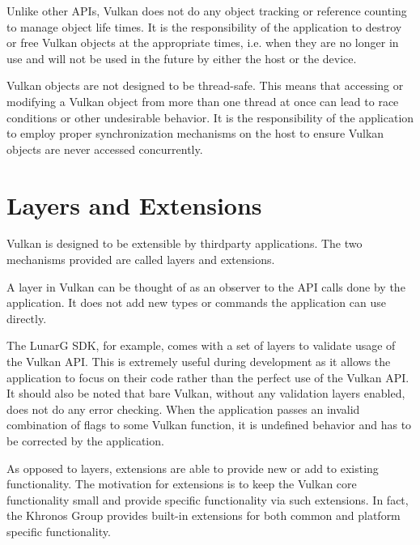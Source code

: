     Unlike other APIs, Vulkan does not do any object tracking or reference counting to manage object life times.
    It is the responsibility of the \gls{application} to destroy or free Vulkan objects at the appropriate times, i.e.
    when they are no longer in use and will not be used in the future by either the \gls{host} or the device.

    Vulkan objects are not designed to be thread-safe.
    This means that accessing or modifying a Vulkan object from more than one thread at once can lead to race conditions or other undesirable behavior.
    It is the responsibility of the \gls{application} to employ proper synchronization mechanisms on the \gls{host} to ensure Vulkan objects are never accessed concurrently.

  \section{Layers and Extensions}
  \label{sec:LayersAndExtensions}

    Vulkan is designed to be extensible by thirdparty \glspl{application}. The two mechanisms provided are called layers and extensions.

    A layer in Vulkan can be thought of as an observer to the API calls done by the \gls{application}. It does not add new types or commands the \gls{application} can use directly.

    The LunarG SDK, for example, comes with a set of layers to validate usage of the Vulkan API. This is extremely useful during development as it allows the \gls{application} to focus on their code rather than the perfect use of the Vulkan API. It should also be noted that bare Vulkan, without any validation layers enabled, does not do any error checking. When the \gls{application} passes an invalid combination of flags to some Vulkan function, it is undefined behavior and has to be corrected by the \gls{application}.


    As opposed to layers, extensions are able to provide new or add to existing functionality. The motivation for extensions is to keep the Vulkan core functionality small and provide specific functionality via such extensions. In fact, the Khronos Group provides built-in extensions for both common and platform specific functionality.

